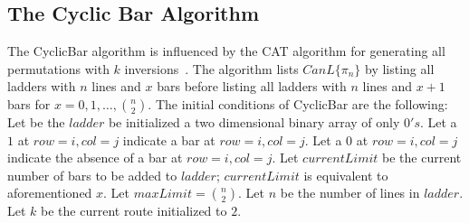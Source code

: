 \subsection{The Cyclic Bar Algorithm}

The {\sc CyclicBar} algorithm is influenced by the CAT algorithm for generating all permutations with $k$ inversions~\cite{A26}.
The algorithm lists $CanL\{\pi_{n}\}$ by listing all ladders with $n$ lines and $x$ bars before listing all ladders with 
$n$ lines and $x+1$ bars for $x=0,1, \dots ,{n \choose 2}$. The initial conditions of {\sc CyclicBar} are the following: 
Let be the $ladder$ be initialized a two dimensional binary array of only $0's$.
 Let a $1$ at $row=i,col=j$ 
indicate a bar at  $row=i,col=j$. Let a $0$ at $row=i,col=j$ 
indicate the absence of a bar at  $row=i,col=j$. Let $currentLimit$
be the current number of bars to be added to $ladder$; $currentLimit$ is equivalent to aforementioned $x$.
Let $maxLimit={n \choose 2}$. Let $n$ be the number of lines in $ladder$. Let $k$ be the current route initialized 
to $2$. 


